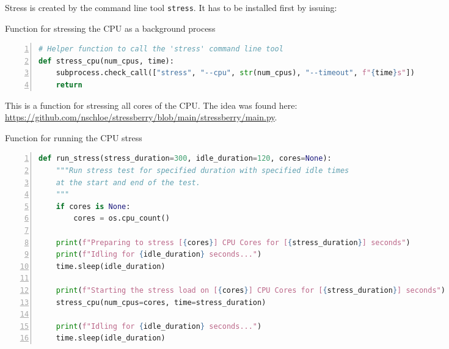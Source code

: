 \documentclass[10pt,parskip=half,
toc=sectionentrywithdots,
bibliography=totocnumbered,
captions=tableheading,numbers=noendperiod]{scrartcl}
\newenvironment{Shaded}{}{}
\newcommand{\NormalTok}[1]{{#1}}
\newcommand{\ExtensionTok}[1]{{#1}}
\begin{document}
Stress is created by the command line tool \texttt{stress}. It has to be
installed first by issuing:

\begin{mdframed}

\begin{Shaded}
\end{Shaded}

\end{mdframed}

\begin{codecell}[H]
\caption{Function for stressing the CPU as a background process}
\label{code:f_stress_cpu}
\begin{lstlisting}[language=Python,numbers=left,xleftmargin=20pt,xrightmargin=5pt,belowskip=5pt,aboveskip=5pt]
# Helper function to call the 'stress' command line tool
def stress_cpu(num_cpus, time):
    subprocess.check_call(["stress", "--cpu", str(num_cpus), "--timeout", f"{time}s"])
    return
\end{lstlisting}\end{codecell}

This is a function for stressing all cores of the CPU. The idea was
found here:
\url{https://github.com/nschloe/stressberry/blob/main/stressberry/main.py}.

\begin{codecell}[H]
\caption{Function for running the CPU stress}
\label{code:f_run_stress_cpu}
\begin{lstlisting}[language=Python,numbers=left,xleftmargin=20pt,xrightmargin=5pt,belowskip=5pt,aboveskip=5pt]
def run_stress(stress_duration=300, idle_duration=120, cores=None):
    """Run stress test for specified duration with specified idle times
    at the start and end of the test.
    """
    if cores is None:
        cores = os.cpu_count()

    print(f"Preparing to stress [{cores}] CPU Cores for [{stress_duration}] seconds")
    print(f"Idling for {idle_duration} seconds...")
    time.sleep(idle_duration)

    print(f"Starting the stress load on [{cores}] CPU Cores for [{stress_duration}] seconds")
    stress_cpu(num_cpus=cores, time=stress_duration)

    print(f"Idling for {idle_duration} seconds...")
    time.sleep(idle_duration)
\end{lstlisting}\end{codecell}
\end{document}
